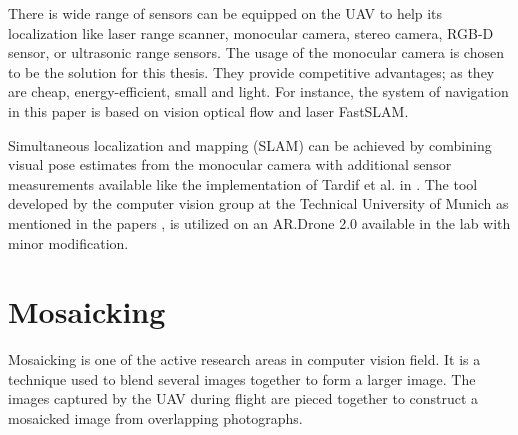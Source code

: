  
 There is wide range of sensors can be equipped on the UAV to help its localization like laser range scanner, monocular camera, stereo camera, RGB-D sensor, or ultrasonic range sensors. The usage of the monocular camera is chosen to be the solution for this thesis. They provide competitive advantages; as they are cheap, energy-efficient, small and light. For instance, the system of navigation in this paper \cite{fei2013comprehensive} is based on vision optical flow and laser FastSLAM.
 
 Simultaneous localization and mapping (SLAM) can be achieved by combining visual pose estimates from the monocular camera  with additional sensor measurements available like the implementation of Tardif et al. in \cite{tardif2008monocular}. The tool developed by the computer vision group at the Technical University of Munich as mentioned in the papers \cite{engel14ras,engel12iros}, is utilized on an AR.Drone 2.0 available in the lab with minor modification. 
 
\section{Mosaicking}
Mosaicking is one of the active research areas in computer vision field. It is a technique used to blend several images together to form a larger image. The images captured by the UAV during flight are pieced together to construct a mosaicked image from overlapping photographs. 

